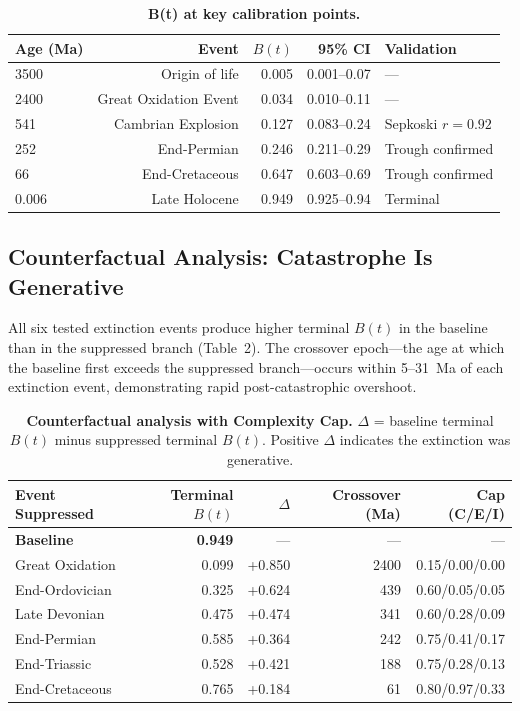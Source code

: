 \documentclass[10pt,letterpaper]{article}
\newcommand{\bt}{$B(t)$}
\begin{document}
\begin{table}[H]
\caption{{\bf B(t) at key calibration points.}}
\begin{tabular}{lrrrl}
\toprule
Age (Ma) & Event & $B(t)$ & 95\% CI & Validation \\
\midrule
3500 & Origin of life & 0.005 & 0.001--0.07 & --- \\
2400 & Great Oxidation Event & 0.034 & 0.010--0.11 & --- \\
541 & Cambrian Explosion & 0.127 & 0.083--0.24 & Sepkoski $r = 0.92$ \\
252 & End-Permian & 0.246 & 0.211--0.29 & Trough confirmed \\
66 & End-Cretaceous & 0.647 & 0.603--0.69 & Trough confirmed \\
0.006 & Late Holocene & 0.949 & 0.925--0.94 & Terminal \\
\bottomrule
\end{tabular}
\end{table}

\subsection*{Counterfactual Analysis: Catastrophe Is Generative}

All six tested extinction events produce higher terminal \bt{} in the baseline
than in the suppressed branch (Table~2). The crossover epoch---the age at which
the baseline first exceeds the suppressed branch---occurs within 5--31~Ma of each
extinction event, demonstrating rapid post-catastrophic overshoot.

\begin{table}[H]
\caption{{\bf Counterfactual analysis with Complexity Cap.}
$\Delta$ = baseline terminal $B(t)$ minus suppressed terminal $B(t)$.
Positive $\Delta$ indicates the extinction was generative.}
\begin{tabular}{lrrrr}
\toprule
Event Suppressed & Terminal $B(t)$ & $\Delta$ & Crossover (Ma) & Cap (C/E/I) \\
\midrule
\textbf{Baseline} & \textbf{0.949} & --- & --- & --- \\
Great Oxidation & 0.099 & +0.850 & 2400 & 0.15/0.00/0.00 \\
End-Ordovician & 0.325 & +0.624 & 439 & 0.60/0.05/0.05 \\
Late Devonian & 0.475 & +0.474 & 341 & 0.60/0.28/0.09 \\
End-Permian & 0.585 & +0.364 & 242 & 0.75/0.41/0.17 \\
End-Triassic & 0.528 & +0.421 & 188 & 0.75/0.28/0.13 \\
End-Cretaceous & 0.765 & +0.184 & 61 & 0.80/0.97/0.33 \\
\bottomrule
\end{tabular}
\end{table}
\end{document}

